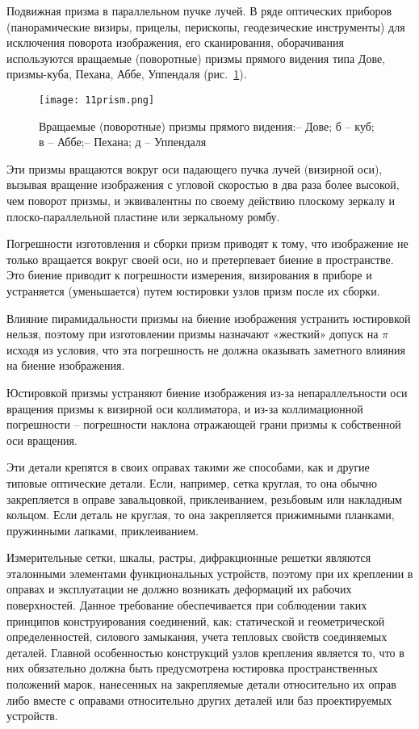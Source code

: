 Подвижная призма в параллельном пучке лучей. В ряде оптических приборов (панорамические визиры, прицелы, перископы, геодезические инструменты) для исключения поворота изображения, его сканирования, оборачивания используются вращаемые (поворотные) призмы прямого видения типа Дове, призмы-куба, Пехана, Аббе, Уппендаля (рис.~\ref{pic:11prism}).

\begin{figure}[h!]
	\texttt{[image: 11prism.png]}
	\caption[Вращаемые (поворотные) призмы прямого видения]{ Вращаемые (поворотные) призмы прямого видения: -- Дове; б -- куб; в -- Аббе; -- Пехана; д -- Уппендаля }
	\label{pic:11prism}
\end{figure}

Эти призмы вращаются вокруг оси падающего пучка лучей (визирной оси), вызывая вращение изображения с угловой скоростью в два раза более высокой, чем поворот призмы, и эквивалентны по своему действию плоскому зеркалу и плоско-параллельной пластине или зеркальному ромбу.

Погрешности изготовления и сборки призм приводят к тому, что изображение не только вращается вокруг своей оси, но и претерпевает биение в пространстве. Это биение приводит к погрешности измерения, визирования в приборе и устраняется (уменьшается) путем юстировки узлов призм после их сборки.

Влияние пирамидальности призмы на биение изображения устранить юстировкой нельзя, поэтому при изготовлении призмы назначают «жесткий» допуск на $ \pi $ исходя из условия, что эта погрешность не должна оказывать заметного влияния на биение изображения.

Юстировкой призмы устраняют биение изображения из-за непараллелъности оси вращения призмы к визирной оси коллиматора, и из-за  коллимационной погрешности – погрешности наклона отражающей грани призмы к собственной оси вращения.

Эти детали крепятся в своих оправах такими же способами, как и другие типовые оптические детали. Если, например, сетка круглая, то она обычно закрепляется в оправе завальцовкой, приклеиванием, резьбовым или накладным кольцом. 
Если деталь не круглая, то она закрепляется прижимными планками, пружинными лапками, приклеиванием.

Измерительные сетки, шкалы, растры, дифракционные решетки являются эталонными элементами функциональных устройств, поэтому при их креплении в оправах и эксплуатации не должно возникать деформаций их рабочих поверхностей. Данное требование обеспечивается при соблюдении таких принципов конструирования соединений, как: статической и геометрической определенностей, силового замыкания, учета тепловых свойств соединяемых деталей.
Главной особенностью конструкций узлов крепления является то, что в них обязательно должна быть предусмотрена юстировка пространственных положений марок, нанесенных на закрепляемые детали относительно их оправ либо вместе с оправами относительно других деталей или баз проектируемых устройств.

